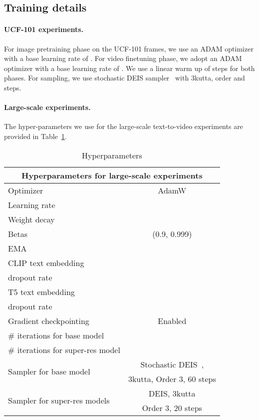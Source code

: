 \documentclass[10pt,twocolumn,letterpaper]{article}
\begin{document}
\subsection{Training details}
\label{sec:training_details}
\paragraph{UCF-101 experiments.} For image pretraining phase on the UCF-101 frames, we use an ADAM optimizer with a base learning rate of . For video finetuning phase, we adopt an ADAM optimizer with a base learning rate of . We use a linear warm up of  steps for both phases. For sampling, we use stochastic DEIS sampler~\cite{zhang2023fast, karras2022elucidating} with 3kutta, order  and  steps.

\paragraph{Large-scale experiments.} The hyper-parameters we use for the large-scale text-to-video experiments are provided in Table~\ref{tab:hyperparams}.




\begin{table}[ht!]
    \centering
    \caption{Hyperparameters}
    \vspace{-1mm}
    \label{tab:hyperparams}
\begin{tabular}{l c}
        \toprule
        \multicolumn{2}{c}{Hyperparameters for large-scale experiments}\\
        \midrule
        Optimizer & AdamW \\
        Learning rate &  \\
        Weight decay &  \\
        Betas & (0.9, 0.999) \\
        EMA &  \\
        CLIP text embedding & \multirow{2}{*}{} \\
        dropout rate & \\
        T5 text embedding  & \multirow{2}{*}{} \\
        dropout rate & \\
        Gradient checkpointing & Enabled \\
        \# iterations for base model &  \\
        \# iterations for super-res model &  \\
        \multirow{2}{*}{Sampler for base model} & Stochastic DEIS~\cite{zhang2023fast, karras2022elucidating},  \\
        & 3kutta, Order 3, 60 steps \\
        \multirow{2}{*}{Sampler for super-res models} & DEIS, 3kutta \\
        & Order 3, 20 steps \\
        \bottomrule
    \end{tabular}
\end{table} 
\end{document}
